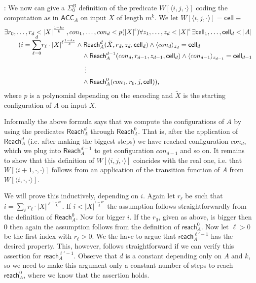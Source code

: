 \documentclass{LMCS}
\newcommand{\abs}[1]{\left\vert#1\right\vert}
\newenvironment{proof}{\QuadSpace\par\noindent{\bf
Proof}:}{\EndProof\HalfSpace} \fi
\newcommand{\QuadSpace}{}\newcommand{\HalfSpace}{}\newcommand{\FullSpace}{}\newcommand{\EndProof}{ \hfill \vrule width 1ex height 1ex depth 0pt }
\newenvironment{proof}{

\smallskip
\noindent\emph{Proof.}}{\hfill\(\Box\)
\bigskip
} \fi
\begin{document}
\begin{proof}
  We now can give a
  $\Sigma^B_0$ definition of the predicate $W[\langle i,j,\cdot\rangle]$ coding the computation as in $\mathsf{ACC}_A$ on input $X$ of length $m^k$. We let $W[\langle i,j,\cdot\rangle]=\mathsf{cell}\equiv$
  \begin{equation*}
    \begin{split}
&
      \exists r_0,\dots,r_d<\abs{X}^{\frac{1-k\epsilon}{k}},con_1,\dots,con_d<p(\abs{X}^{\epsilon})
      \forall z_1,\dots,z_d<\abs{X}^{\epsilon}\exists
      \mathsf{cell}_1,\dots,\mathsf{cell}_d<\abs{A}\\
&\hspace{8 pt}\phantom{{}\equiv{}}
      (i=\smash{\sum_{\ell=0}^d} r_{\ell}\cdot
      \abs{X}^{\ell\frac{1-k\epsilon}{k}}\land \mathsf{Reach}^d_A(\tilde
      X,r_d,z_d,\mathsf{cell}_d)\land\langle
      con_d\rangle_{z_d}=\mathsf{cell}_d\\
&\hspace{118 pt}
      \land
      \mathsf{Reach}^{d-1}_A(con_d,r_{d-1},z_{d-1},\mathsf{cell}_d)\land\langle
      con_{d-1}\rangle_{z_{d-1}}=\mathsf{cell}_{d-1}\\
&\hspace{118 pt}
      \ \vdots\\
&\hspace{118 pt}
      \land \mathsf{Reach}^{0}_A(con_1,r_{0},j,\mathsf{cell})),
    \end{split}
  \end{equation*}
  where $p$ is a polynomial depending on the encoding and $\tilde X$ is the starting configuration of $A$ on input
  $X$.

  Informally the above formula says that we compute the configurations of $A$ by using the predicates
  $\mathsf{Reach}^d_A$ through $\mathsf{Reach}^0_A$. That is, after the application of $\mathsf{Reach}^d_A$
  (i.e. after making the biggest steps) we have reached
  configuration $con_d$, which we plug into $\mathsf{Reach}^{d-1}_A$ to get configuration $con_{d-1}$ and so on.
  It remains to show that this definition of $W[\langle
  i,j,\cdot\rangle]$ coincides with the real one, i.e. that $W[\langle i+1,\cdot,\cdot\rangle]$ follows from an application of the transition
  function of $A$ from $W[\langle i,\cdot,\cdot\rangle]$.

  We will prove this inductively, depending on $i$. Again let $r_{\ell}$ be such that $i=\sum_\ell r_{\ell}\cdot
  \abs{X}^{\ell\frac{1-k\epsilon}{k}}$.
  If $i<\abs{X}^{\frac{1-k\epsilon}{k}}$ the assumption follows straightforwardly from the definition of
  $\mathsf{Reach}^0_A$. Now for bigger $i$. If the $r_0$, given as above, is bigger then $0$ then
  again the assumption follows from the definition of $\mathsf{reach}^0_A$. Now let $\ell>0$ be the first index
  with $r_{\ell}>0$. We the have to argue that $\mathsf{reach}^{\ell'-1}_A$ has the desired property.
  This, however, follows straightforward if we can verify this assertion for $\mathsf{reach}^{\ell'-1}_A$.
  Observe that $d$ is a constant depending only on $A$ and $k$, so we need to make this argument only a
  constant number of steps to reach $\mathsf{reach}^0_A$, where we know that the assertion holds.


\end{proof}
\end{document}
